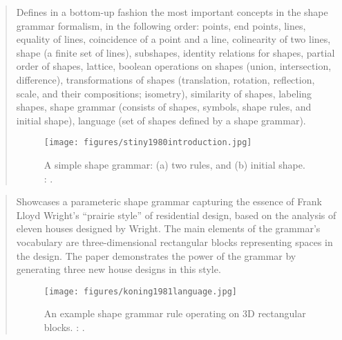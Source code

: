 		\begin{quote}
		\small
		Defines in a bottom-up fashion the most important concepts in the shape grammar formalism, 
		in the following order:
		points, end points, lines, equality of lines, 
		coincidence of a point and a line, 
		colinearity of two lines,
		shape (a finite set of lines),
		subshapes,
		identity relations for shapes,
		partial order of shapes,
		lattice,
		boolean operations on shapes (union, intersection, difference),
		transformations of shapes (translation, rotation, 
		reflection, scale, and their compositions; isometry),
		similarity of shapes,
		labeling shapes,
		shape grammar (consists of shapes, symbols, shape rules, and initial shape),
		language (set of shapes defined by a shape grammar).
		\begin{figure}[htb]
		\begin{center}
		\texttt{[image: figures/stiny1980introduction.jpg]}
		\caption{
		A simple shape grammar: (a) two rules, and (b) initial shape. 
		\citeauthor{stiny1980introduction}: 
		\cite{stiny1980introduction}.}
		\label{fig:stiny1980introduction}
		\end{center}
		\end{figure}		
		\end{quote}

		\begin{quote}
		\small
		Showcases a parameteric shape grammar capturing the essence of Frank Lloyd Wright's
		``prairie style'' of residential design, based on the analysis of eleven
		houses designed by Wright. 
		The main elements of the grammar's vocabulary are three-dimensional rectangular
		blocks representing spaces in the design. The paper demonstrates the power
		of the grammar by generating three new house designs in this style.
		\begin{figure}[htb]
		\begin{center}
		\texttt{[image: figures/koning1981language.jpg]}
		\caption{
		An example shape grammar rule operating on 3D rectangular blocks. 
		\citeauthor{koning1981language}: 
		\cite{koning1981language}.}
		\label{fig:koning1981language}
		\end{center}
		\end{figure}		
		\end{quote}
		
